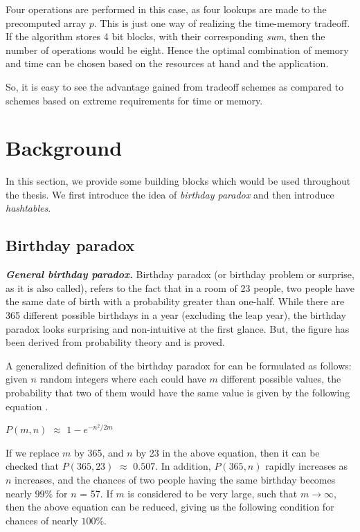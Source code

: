 Four operations are performed in this case, as four lookups are made to the precomputed array $p$. This is just one way of realizing the time-memory tradeoff. If the algorithm stores 4 bit blocks, with their corresponding \textit{sum}, then the number of operations would be eight. Hence the optimal combination of memory and time can be chosen based on the resources at hand and the application. 

So, it is easy to see the advantage gained from tradeoff schemes as compared to schemes based on extreme requirements for time or memory. 

\section{Background}

In this section, we provide some building blocks which would be used throughout the thesis. We first introduce the idea of \textit{birthday paradox} and then introduce \textit{hashtables}.

\subsection{Birthday paradox}
\label{sec:bday-paradox}

\indent \textit{\textbf{General birthday paradox.}} Birthday paradox (or birthday problem or surprise, as it is also called), refers to the fact that in a room of 23 people, two people have the same date of birth with a probability greater than one-half. While there are 365 different possible birthdays in a year (excluding the leap year), the birthday paradox looks surprising and non-intuitive at the first glance. But, the figure has been derived from probability theory and is proved. 

A generalized definition of the birthday paradox for can be formulated as follows: given $n$ random integers where each could have $m$ different possible values, the probability that two of them would have the same value is given by the following equation \cite{menezes}.

\begin{center}
$P(m,n)$ $\approx$ $1 - e^{-{n^2}/{2m}}$
\end{center}

If we replace $m$ by 365, and $n$ by 23 in the above equation, then it can be checked that $P(365,23)$ $\approx$ $0.507$. In addition, $P(365,n)$ rapidly increases as $n$ increases, and the chances of two people having the same birthday becomes nearly $99 \%$ for $n$ = 57. If $m$ is considered to be very large, such that $m \rightarrow \infty$, then the above equation can be reduced, giving us the following condition for chances of nearly $100 \%$. 


